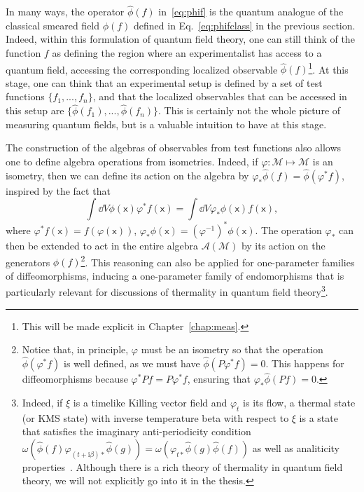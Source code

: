 \documentclass[letterpaper,12pt,titlepage,oneside,final]{book}
\newcommand{\M}{\mathcal{M}}
\newcommand{\mf}{\mathsf}%
\newcommand{\ii}{\mathrm{i}}
\begin{document}
In many ways, the operator $\hat{\phi}(f)$ in~\eqref{eq:phif} is the quantum analogue of the classical smeared field $\phi(f)$ defined in Eq.~\eqref{eq:phifclass} in the previous section. Indeed, within this formulation of quantum field theory, one can still think of the function $f$ as defining the region where an experimentalist has access to a quantum field, accessing the corresponding localized observable $\hat{\phi}(f)$\footnote{This will be made explicit in Chapter~\ref{chap:meas}.}. At this stage, one can think that an experimental setup is defined by a set of test functions $\{f_1,...,f_n\}$, and that the localized observables that can be accessed in this setup are $\{\hat{\phi}(f_1),...,\hat{\phi}(f_n)\}$. This is certainly not the whole picture of measuring quantum fields, but is a valuable intuition to have at this stage.

The construction of the algebras of observables from test functions also allows one to define algebra operations from isometries. Indeed, if $\varphi:\M\mapsto\M$ is an isometry, then we can define its action on the algebra by $\varphi_*\hat{\phi}(f) = \hat{\phi}(\varphi^*f)$, inspired by the fact that
\begin{equation}
    \int \dd V \phi(\mf x) \varphi^*f(\mf x) = \int \dd V \varphi_*\phi(\mf x) f(\mf x),
\end{equation}
where $\varphi^*f(\mf x) = f(\varphi(\mf x))$, $\varphi_*\phi(\mf x) = (\varphi^{-1})^*\phi(\mf x)$. The operation $\varphi_*$ can then be extended to act in the entire algebra $\mathcal{A}(\M)$ by its action on the generators $\hat{\phi}(f)$\footnote{Notice that, in principle, $\varphi$ must be an isometry so that the operation $\hat{\phi}(\varphi^*f)$ is well defined, as we must have $\hat{\phi}(P\varphi^*f) = 0$. This happens for diffeomorphisms because $\varphi^*Pf = P\varphi^*f$, ensuring that $\varphi_*\hat{\phi}(Pf) = 0$.}. This reasoning can also be applied for one-parameter families of diffeomorphisms, inducing a one-parameter family of endomorphisms that is particularly relevant for discussions of thermality in quantum field theory\footnote{Indeed, if $\xi$ is a timelike Killing vector field and $\varphi_t$ is its flow, a thermal state (or KMS state) with inverse temperature beta with respect to $\xi$ is a state that satisfies the imaginary anti-periodicity condition $\omega(\hat{\phi}(f)\varphi_{(t+\ii \beta)*}\hat{\phi}(g)) = \omega(\varphi_{t*}\hat{\phi}(g)\hat{\phi}(f))$ as well as analiticity properties~\cite{Kubo,MartinSchwinger,KMSreview}. Although there is a rich theory of thermality in quantum field theory, we will not explicitly go into it in the thesis.}.
\end{document}

